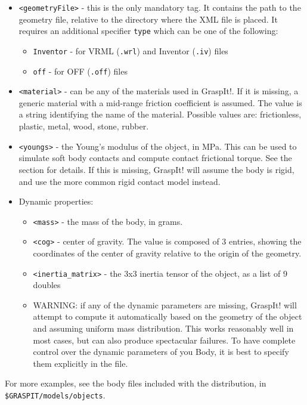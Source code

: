 \begin{itemize}
\item \texttt{<geometryFile>} - this is the only mandatory tag. It
  contains the path to the geometry file, relative to the directory
  where the XML file is placed. It requires an additional specifier
  \texttt{type} which can be one of the following:
  \begin{itemize}
    \item \texttt{Inventor} - for VRML (\texttt{.wrl}) and Inventor
      (\texttt{.iv}) files
    \item \texttt{off} - for OFF (\texttt{.off}) files
  \end{itemize}
  \item \texttt{<material>} - can be any of the materials used in
    GraspIt!. If it is missing, a generic material with a mid-range
    friction coefficient is assumed. The value is a string identifying
    the name of the material. Possible values are: frictionless,
    plastic, metal, wood, stone, rubber.
  \item \texttt{<youngs>} - the Young's modulus of the object, in
    MPa. This can be used to simulate soft body contacts and compute
    contact frictional torque. See the  section for details. If this is
    missing, GraspIt! will assume the body is rigid, and use the more
    common rigid contact model instead.
  \item Dynamic properties:
  \begin{itemize}
    \item \texttt{<mass>} - the mass of the body, in grams.
    \item \texttt{<cog>} - center of gravity. The value is composed of 3
      entries, showing the coordinates of the center of gravity
      relative to the origin of the geometry.
    \item \texttt{<inertia\_matrix>} - the 3x3 inertia tensor of the
      object, as a list of 9 doubles
    \item{WARNING:} if any of the dynamic parameters are missing,
      GraspIt! will attempt to compute it automatically based on the
      geometry of the object and assuming uniform mass
      distribution. This works reasonably well in most cases, but can
      also produce spectacular failures. To have complete control over
      the dynamic parameters of you Body, it is best to specify them
      explicitly in the file.
  \end{itemize}
\end{itemize}

For more examples, see the body files included with the distribution,
in \texttt{\$GRASPIT/models/objects}.



